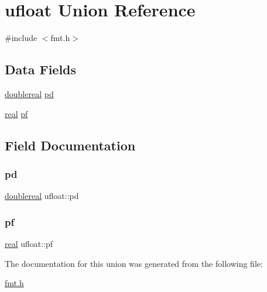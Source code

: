 \hypertarget{unionufloat}{}\section{ufloat Union Reference}
\label{unionufloat}


{\ttfamily \#include $<$fmt.\+h$>$}

\subsection*{Data Fields}
\begin{DoxyCompactItemize}
\item 
\hyperlink{dependencies_2third-party_2clapack_23_82_81_2_f2_c_l_i_b_s_2libf2c_2f2c_8h_a1e69afaa4e6077b67397e6c36454b97a}{doublereal} \hyperlink{unionufloat_ae96bce00e20b54e28f329ff8176f3bec}{pd}
\item 
\hyperlink{dependencies_2third-party_2clapack_23_82_81_2_f2_c_l_i_b_s_2libf2c_2f2c_8h_a031f8951175b43076c2084a6c2173410}{real} \hyperlink{unionufloat_a15d01c7f594afd33c56b9d990ba215f7}{pf}
\end{DoxyCompactItemize}


\subsection{Field Documentation}
\mbox{\label{unionufloat_ae96bce00e20b54e28f329ff8176f3bec}} 
\subsubsection{\texorpdfstring{pd}{pd}}
{\footnotesize\ttfamily \hyperlink{dependencies_2third-party_2clapack_23_82_81_2_f2_c_l_i_b_s_2libf2c_2f2c_8h_a1e69afaa4e6077b67397e6c36454b97a}{doublereal} ufloat\+::pd}

\mbox{\label{unionufloat_a15d01c7f594afd33c56b9d990ba215f7}} 
\subsubsection{\texorpdfstring{pf}{pf}}
{\footnotesize\ttfamily \hyperlink{dependencies_2third-party_2clapack_23_82_81_2_f2_c_l_i_b_s_2libf2c_2f2c_8h_a031f8951175b43076c2084a6c2173410}{real} ufloat\+::pf}



The documentation for this union was generated from the following file\+:\begin{DoxyCompactItemize}
\item 
\hyperlink{fmt_8h}{fmt.\+h}\end{DoxyCompactItemize}

